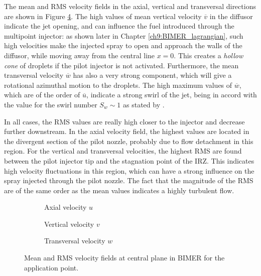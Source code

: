The mean and RMS velocity fields in the axial, vertical and transversal directions are shown in Figure \ref{fig:field_application}. The high values of mean vertical velocity $\overline{v}$ in the diffusor indicate the jet opening, and can influence the fuel introduced through the multipoint injector: as shown later in Chapter \ref{ch9:BIMER_lagrangian}, such high velocities make the injected spray to open and approach the walls of the diffusor, while moving away from the central line $x = 0$. This creates a \textsl{hollow cone} of droplets if the pilot injector is not activated. Furthermore, the mean transversal velocity $\overline{w}$ has also a very strong component, which will give a rotational azimuthal motion to the droplets. The high maximum values of $\overline{w}$, which are of the order of $\overline{u}$, indicate a strong swirl of the jet, being in accord with the value for the swirl number $S_w \sim 1$ as stated by .

In all cases, the RMS values are really high closer to the injector and decrease further downstream. In the axial velocity field, the highest values are located in the divergent section of the pilot nozzle, probably due to flow detachment in this region.  For the vertical and transversal velocities, the highest RMS are found between the pilot injector tip and the stagnation point of the IRZ. This indicates high velocity fluctuations in this region, which can have a strong influence on the spray injected through the pilot nozzle. The fact that the magnitude of the RMS are of the same order as the mean values indicates a highly turbulent flow. 


\clearpage


\begin{figure}[ht]
\centering
\begin{subfigure}[b]{1.0\textwidth}
	\centering
   \caption{Axial velocity $u$}
   \label{fig:field_application_axial_velocity}
\end{subfigure}
\begin{subfigure}[b]{1.0\textwidth}
	\centering
   \caption{Vertical velocity $v$}
   \label{fig:field_application_vertical_velocity}
\end{subfigure}
\begin{subfigure}[b]{1.0\textwidth}
	\centering
   \caption{Transversal velocity $w$}
   \label{fig:field_application_transversal_velocity} 
\end{subfigure}
\caption[Mean and RMS velocity fields at central plane in BIMER for the application point]{Mean and RMS velocity fields at central plane in BIMER for the application point.}
\label{fig:field_application}
\end{figure}

